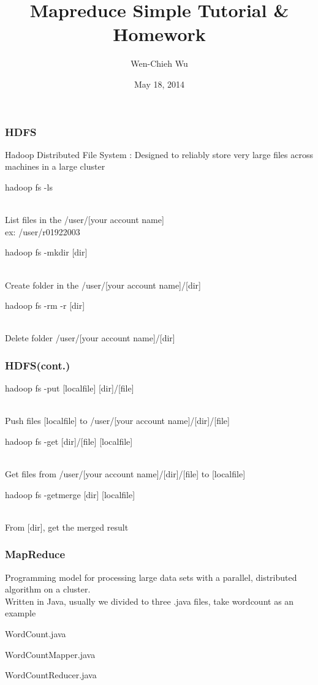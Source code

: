 \documentclass[12pt]{beamer}
\title{Mapreduce Simple Tutorial \& Homework}
\author{Wen-Chieh Wu}
\date{May 18, 2014}
\begin{document}
\maketitle

\begin{frame}
  \frametitle{HDFS}
  Hadoop Distributed File System : Designed to reliably store very large files across machines in a large cluster
  \begin{itemize}
    {\item hadoop fs -ls}\\
      List files in the /user/[your account name]\\
      ex: /user/r01922003
    {\item hadoop fs -mkdir [dir]}\\
      Create folder in the /user/[your account name]/[dir]
    {\item hadoop fs -rm -r [dir]}\\
      Delete folder /user/[your account name]/[dir]
  \end{itemize}
\end{frame}

\begin{frame}
  \frametitle{HDFS(cont.)}
  \begin{itemize}
    {\item hadoop fs -put [localfile] [dir]/[file]}\\
      Push files [localfile] to /user/[your account name]/[dir]/[file]
    {\item hadoop fs -get [dir]/[file] [localfile]}\\
      Get files from /user/[your account name]/[dir]/[file] to [localfile]
    {\item hadoop fs -getmerge [dir] [localfile]}\\
      From [dir], get the merged result
  \end{itemize}
\end{frame}

\begin{frame}
  \frametitle{MapReduce}
  Programming model for processing large data sets with a parallel, distributed algorithm on a cluster.\\
  Written in Java, usually we divided to three .java files, take wordcount as an example\\
  \begin{itemize}
    {\item WordCount.java}
    {\item WordCountMapper.java}
    {\item WordCountReducer.java}
  \end{itemize}
\end{frame}
\end{document}
